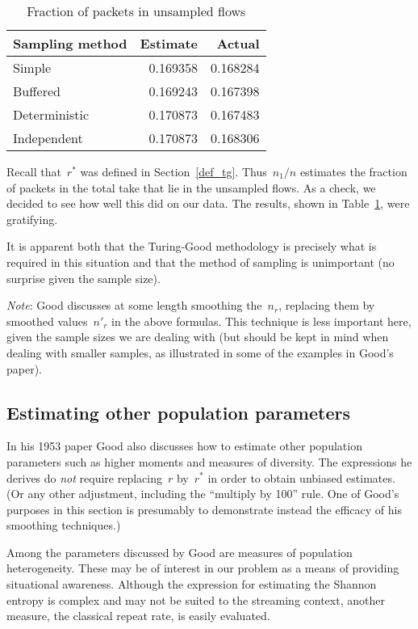 \documentclass{paper}
\begin{document}
\begin{table}
\begin{center}
\begin{tabular}{l r r}
Sampling method & Estimate & Actual   \\
\midrule
Simple          & 0.169358 & 0.168284 \\
Buffered        & 0.169243 & 0.167398 \\
Deterministic   & 0.170873 & 0.167483 \\
Independent     & 0.170873 & 0.168306 \\
\end{tabular}
\caption{Fraction of packets in unsampled flows}
\label{uns_flows}
\end{center}
\end{table}

Recall that~$r^*$ was defined in Section~\ref{def_tg}. Thus~$n_1/n$ estimates
the fraction of packets in the total take that lie in the unsampled flows. As a
check, we decided to see how well this did on our data. The results, shown in
Table~\ref{uns_flows}, were gratifying.

It is apparent both that the Turing-Good methodology is precisely what is
required in this situation and that the method of sampling is unimportant (no
surprise given the sample size).

\emph{Note}: Good discusses at some length smoothing the~$n_r$, replacing them
by smoothed values~$n'_r$ in the above formulas. This technique is less
important here, given the sample sizes we are dealing with (but should be kept
in mind when dealing with smaller samples, as illustrated in some of the
examples in Good's paper).

\subsection{Estimating other population parameters}

In his 1953 paper Good also discusses how to estimate other population
parameters such as higher moments and measures of diversity. The expressions he
derives do \emph{not} require replacing~$r$ by~$r^*$ in order to obtain unbiased
estimates. (Or any other adjustment, including the ``multiply by 100'' rule.
One of Good's purposes in this section is presumably to demonstrate instead the
efficacy of his smoothing techniques.)

Among the parameters discussed by Good are measures of population heterogeneity.
These may be of interest in our problem as a means of providing situational
awareness. Although the expression for estimating the Shannon entropy is complex
and may not be suited to the streaming context, another measure, the classical
repeat rate, is easily evaluated.
\end{document}
